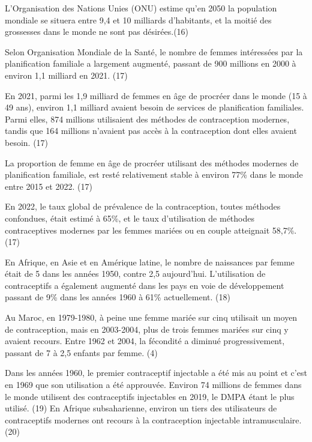 \noindent L’Organisation des Nations Unies (ONU) estime qu’en 2050 la population mondiale se situera entre 9,4 et 10 milliards d’habitants, et la moitié des grossesses dans le monde ne sont pas désirées.(16) \vspace*{1em}

\noindent Selon Organisation Mondiale de la Santé, le nombre de femmes intéressées par la planification familiale a largement augmenté, passant de 900 millions en 2000 à environ 1,1 milliard en 2021. (17)\vspace*{1em}
  
\noindent En 2021, parmi les 1,9 milliard de femmes en âge de procréer dans le monde (15 à 49 ans), environ 1,1 milliard avaient besoin de services de planification familiales. Parmi elles, 874 millions utilisaient des méthodes de contraception modernes, tandis que 164 millions n’avaient pas accès à la contraception dont elles avaient besoin. (17)\vspace*{1em}

\noindent La proportion de femme en âge de procréer utilisant des méthodes modernes de planification familiale, est resté relativement stable à environ 77\% dans le monde entre 2015 et 2022. (17)\vspace*{1em}

\noindent En 2022, le taux global de prévalence de la contraception, toutes méthodes confondues, était estimé à 65\%, et le taux d’utilisation de méthodes contraceptives modernes par les femmes mariées ou en couple atteignait 58,7\%.(17)  \vspace*{1em}

\noindent En Afrique, en Asie et en Amérique latine, le nombre de naissances par femme était de 5 dans les années 1950, contre 2,5 aujourd’hui. L’utilisation de contraceptifs a également augmenté dans les pays en voie de développement passant de 9\% dans les années 1960 à 61\% actuellement. (18) \vspace*{1em}

\noindent Au Maroc, en 1979-1980, à peine une femme mariée sur cinq utilisait un moyen de contraception, mais en 2003-2004, plus de trois femmes mariées sur cinq y avaient recours. Entre 1962 et 2004, la fécondité a diminué progressivement, passant de 7 à 2,5 enfants par femme. (4) \vspace*{1em}

\noindent Dans les années 1960, le premier contraceptif injectable a été mis au point et c’est en 1969 que son utilisation a été approuvée. Environ 74 millions de femmes dans le monde utilisent des contraceptifs injectables en 2019, le DMPA étant le plus utilisé. (19) En Afrique subsaharienne, environ un tiers des utilisateurs de contraceptifs modernes ont recours à la contraception injectable intramusculaire. (20)\vspace*{1em}

